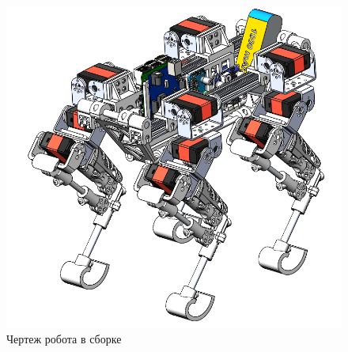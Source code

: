 \begin{figure}[h]
    \centering
    \includegraphics[width=\textwidth]{chapter_mechanics_construction/figure23.png}
    \caption{Чертеж робота в сборке}
    \label{fig:final_drawing}
\end{figure}
